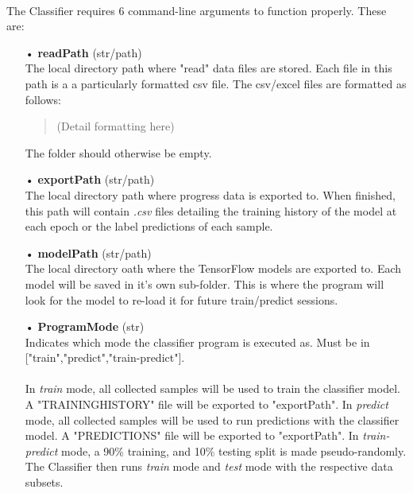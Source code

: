 \documentclass[12pt,letterpaper]{article}
\begin{document}
\paragraph*{}The Classifier requires 6 command-line arguments to function properly. These are:
\begin{itemize}

\item[•]\textbf{readPath} (str/path)\\
The local directory path where "read" data files are stored. Each file in this path is a a particularly formatted csv file. The csv/excel files are formatted as follows:
\begin{quote}
(Detail formatting here)
\end{quote}
The folder should otherwise be empty.

\item[•]\textbf{exportPath} (str/path)\\
The local directory path where progress data is exported to. When finished, this path will contain \textit{.csv} files detailing the training history of the model at each epoch or the label predictions of each sample.

\item[•]\textbf{modelPath} (str/path)\\
The local directory oath where the TensorFlow models are exported to. Each model will be saved in it's own sub-folder. This is where the program will look for the model to re-load it for future train/predict sessions. 

\item[•]\textbf{ProgramMode} (str)\\
Indicates which mode the classifier program is executed as. Must be in ["train","predict","train-predict"]. \\
\paragraph*{}In \textit{train} mode, all collected samples will be used to train the classifier model. A "TRAININGHISTORY" file will be exported to "exportPath".  In \textit{predict} mode, all collected samples will be used to run predictions with the classifier model. A "PREDICTIONS" file will be exported to "exportPath". In \textit{train-predict} mode, a 90\% training, and 10\% testing split is made pseudo-randomly. The Classifier then runs \textit{train} mode and \textit{test} mode with the respective data subsets.


\end{itemize}
\end{document}
